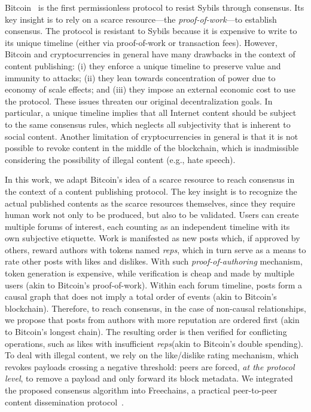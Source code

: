 \documentclass[10pt,journal,compsoc]{IEEEtran}
\newcommand{\FC}       {Freechains\xspace}
\newcommand{\reps}     {\emph{reps}\xspace}
\begin{document}
Bitcoin~\cite{p2p.bitcoin} is the first permissionless protocol to resist
Sybils through consensus.
Its key insight is to rely on a scarce resource---the \emph{proof-of-work}---to
establish consensus.
The protocol is resistant to Sybils because it is expensive to write to its
unique timeline (either via proof-of-work or transaction fees).
%
However, Bitcoin and cryptocurrencies in general have many drawbacks in the
context of content publishing:
    (i)   they enforce a unique timeline to preserve value and immunity to
          attacks;
    (ii)  they lean towards concentration of power due to economy of scale
          effects; and
    (iii) they impose an external economic cost to use the protocol.
These issues threaten our original decentralization goals.
In particular, a unique timeline implies that all Internet content should be
subject to the same consensus rules, which neglects all subjectivity that is
inherent to social content.
Another limitation of cryptocurrencies in general is that it is not possible
to revoke content in the middle of the blockchain, which is inadmissible
considering the possibility of illegal content (e.g., hate speech).

In this work, we adapt Bitcoin's idea of a scarce resource to reach consensus
in the context of a content publishing protocol.
The key insight is to recognize the actual published contents as the scarce
resources themselves, since they require human work not only to be produced,
but also to be validated.
%
Users can create multiple forums of interest, each counting as an independent
timeline with its own subjective etiquette.
Work is manifested as new posts which, if approved by others, reward authors
with tokens named \reps, which in turn serve as a means to rate other posts
with likes and dislikes.
With such \emph{proof-of-authoring} mechanism, token generation is expensive,
while verification is cheap and made by multiple users (akin to Bitcoin's
proof-of-work).
%
Within each forum timeline, posts form a causal graph that does not imply a
total order of events (akin to Bitcoin's blockchain).
Therefore, to reach consensus, in the case of non-causal relationships, we
propose that posts from authors with more reputation are ordered first (akin to
Bitcoin's longest chain).
The resulting order is then verified for conflicting operations, such as likes
with insufficient \reps (akin to Bitcoin's double spending).
%
To deal with illegal content, we rely on the like/dislike rating mechanism,
which revokes payloads crossing a negative threshold: peers are forced,
\emph{at the protocol level}, to remove a payload and only forward its block
metadata.
%
We integrated the proposed consensus algorithm into \FC, a practical
peer-to-peer content dissemination protocol~\cite{fcs.sbseg20}.
\end{document}
